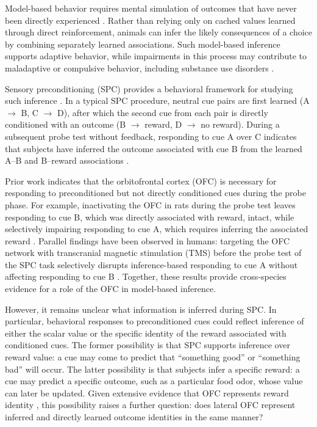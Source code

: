 \documentclass[9pt,twocolumn,twoside]{pnas-new}
\begin{document}
Model-based behavior requires mental simulation of outcomes that have never been
directly experienced \cite{daw2011model,doll2015model,wangkahnt21}. Rather than relying only on cached values learned through direct reinforcement, animals can infer the likely consequences of a choice by combining separately learned associations. Such model-based inference supports adaptive behavior, while impairments in this process may contribute to maladaptive or compulsive behavior, including substance use disorders \cite{kahsch21,kahnt2023computationally}.

Sensory preconditioning (SPC) provides a behavioral framework for studying such inference \cite{kahnt2023computationally,jones12,wang2020interactions}. In a typical SPC procedure, neutral cue pairs are first learned (A $\rightarrow$ B, C $\rightarrow$ D), after which the second cue from each pair is directly conditioned with an outcome (B $\rightarrow$ reward, D $\rightarrow$ no reward). During a subsequent probe test without feedback, responding to cue A over C indicates that subjects have inferred the outcome associated with cue B from the learned A--B and B--reward associations \cite{Brogden39,jones12,RN515}.

Prior work indicates that the orbitofrontal cortex (OFC) is necessary for responding to preconditioned but not directly conditioned cues during the probe phase. For example, inactivating the OFC in rats during the probe test leaves responding to cue B, which was directly associated with reward, intact, while selectively impairing responding to cue A, which requires inferring the associated reward \cite{jones12}. \Parasplit Parallel findings have been observed in humans: targeting the OFC network with transcranial magnetic stimulation (TMS) before the probe test of the SPC task selectively disrupts inference-based responding to cue A without affecting responding to cue B \cite{wang2020targeted}. Together, these results provide cross-species evidence for a role of the OFC in model-based inference.

However, it remains unclear what information is inferred during SPC. In particular, behavioral responses to preconditioned cues could reflect inference of either the scalar value or the specific identity of the reward associated with conditioned cues. The former possibility is that SPC supports inference over reward value: a cue may come to predict that ``something good'' or ``something bad'' will occur. The latter possibility is that subjects infer a specific reward: a cue may predict a specific outcome, such as a particular food odor, whose value can later be updated. Given extensive evidence that OFC represents reward identity \cite{klein2013segregated,mcnamee13,RN14,howard2015identity,howard2017identity,howard2018identity,howard2021specific,liuyaoatt24,witkowski2026identity}, this possibility raises a further question: does lateral OFC represent inferred and directly learned outcome identities in the same manner?
\end{document}
